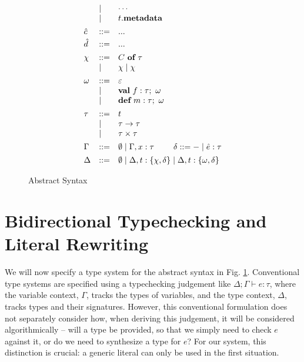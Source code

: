 \begin{figure}[t]
\[\begin{array}[t]{lll}
     & \mathrel{\mid} & \cdots \\
     & \mathrel{\mid} & t.\textbf{metadata} 
\\[1ex]
\hat c    & ::= & ...
	 \\[.5ex]
\hat d   & ::= & ... 
\\[1ex] 
\chi & ::= & C~\textbf{of}~\tau\\
     & \mathrel{\mid} & \chi \mathrel{\mid} \chi 
\\[1ex]
\omega &::= & \varepsilon \\  
         & \mathrel{\mid} & \textbf{val}~ f:\tau;~\omega\\
         & \mathrel{\mid} & \textbf{def}~ m:\tau;~\omega 
\\[1ex]
\tau & ::= & t\\
     & \mathrel{\mid} & \tau \rightarrow \tau \\
     & \mathrel{\mid} & \tau \times \tau 
\\[1ex]
\Gamma & ::= & \emptyset \mathrel{\mid} \Gamma, x:\tau~~~~~~~\delta ::= - \mathrel{\mid} \hat{e} : \tau
\\[1ex]
\Delta & ::= & \emptyset \mathrel{\mid} \Delta, t:\{\chi, \delta\} \mathrel{\mid} \Delta, t:\{\omega, \delta\}
\end{array}
\]
\vspace{-12px}
\caption{Abstract Syntax}
\vspace{-15px}
\label{fig:core2-syntax}
\end{figure}

\section{Bidirectional Typechecking and Literal Rewriting}
We will now specify a type system for the abstract syntax in Fig. \ref{fig:core2-syntax}. Conventional type systems are specified using a typechecking judgement like $\Delta; \Gamma \vdash e : \tau$, where the variable context, $\Gamma$, tracks the types of variables, and the type context, $\Delta$, tracks types and their signatures. However, this conventional formulation does not separately consider how, when deriving this judgement, it will be considered algorithmically -- will a type be provided, so that we simply need to check $e$ against it, or do we need to synthesize a type for $e$? For our system, this distinction is crucial: a generic literal can only be used in the first situation. 

